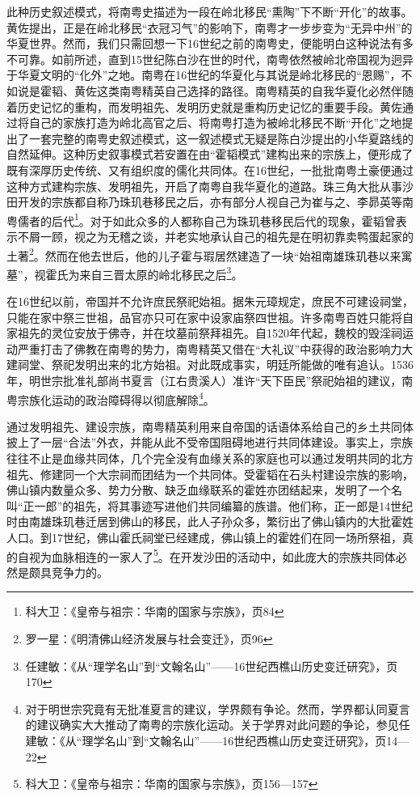 此种历史叙述模式，将南粤史描述为一段在岭北移民“熏陶”下不断“开化”的故事。黄佐提出，正是在岭北移民“衣冠习气”的影响下，南粤才一步步变为“无异中州”的华夏世界。然而，我们只需回想一下16世纪之前的南粤史，便能明白这种说法有多不可靠。如前所述，直到15世纪陈白沙在世的时代，南粤依然被岭北帝国视为迥异于华夏文明的“化外”之地。南粤在16世纪的华夏化与其说是岭北移民的“恩赐”，不如说是霍韬、黄佐这类南粤精英自己选择的路径。南粤精英的自我华夏化必然伴随着历史记忆的重构，而发明祖先、发明历史就是重构历史记忆的重要手段。黄佐通过将自己的家族打造为岭北高官之后、将南粤打造为被岭北移民不断“开化”之地提出了一套完整的南粤史叙述模式，这一叙述模式无疑是陈白沙提出的小华夏路线的自然延伸。这种历史叙事模式若安置在由“霍韬模式”建构出来的宗族上，便形成了既有深厚历史传统、又有组织度的儒化共同体。在16世纪，一批批南粤土豪便通过这种方式建构宗族、发明祖先，开启了南粤自我华夏化的道路。珠三角大批从事沙田开发的宗族都自称乃珠玑巷移民之后，亦有部分人视自己为崔与之、李昴英等南粤儒者的后代\footnote{科大卫：《皇帝与祖宗：华南的国家与宗族》，页84}。对于如此众多的人都称自己为珠玑巷移民后代的现象，霍韬曾表示不屑一顾，视之为无稽之谈，并老实地承认自己的祖先是在明初靠卖鸭蛋起家的土著\footnote{罗一星：《明清佛山经济发展与社会变迁》，页96}。然而在他去世后，他的儿子霍与瑕居然建造了一块“始祖南雄珠玑巷以来寓墓”，视霍氏为来自三晋太原的岭北移民之后\footnote{任建敏：《从“理学名山”到“文翰名山”——16世纪西樵山历史变迁研究》，页170}。

在16世纪以前，帝国并不允许庶民祭祀始祖。据朱元璋规定，庶民不可建设祠堂，只能在家中祭三世祖，品官亦只可在家中设家庙祭四世祖。许多南粤百姓只能将自家祖先的灵位安放于佛寺，并在坟墓前祭拜祖先。自1520年代起，魏校的毁淫祠运动严重打击了佛教在南粤的势力，南粤精英又借在“大礼议”中获得的政治影响力大建祠堂、祭祀发明出来的北方始祖。对此既成事实，明廷所能做的唯有追认。1536年，明世宗批准礼部尚书夏言（江右贵溪人）准许“天下臣民”祭祀始祖的建议，南粤宗族化运动的政治障碍得以彻底解除\footnote{对于明世宗究竟有无批准夏言的建议，学界颇有争论。然而，学界都认同夏言的建议确实大大推动了南粤的宗族化运动。关于学界对此问题的争论，参见任建敏：《从“理学名山”到“文翰名山”——16世纪西樵山历史变迁研究》，页14—22}。

通过发明祖先、建设宗族，南粤精英利用来自帝国的话语体系给自己的乡土共同体披上了一层“合法”外衣，并能从此不受帝国阻碍地进行共同体建设。事实上，宗族往往不止是血缘共同体，几个完全没有血缘关系的家庭也可以通过发明共同的北方祖先、修建同一个大宗祠而团结为一个共同体。受霍韬在石头村建设宗族的影响，佛山镇内数量众多、势力分散、缺乏血缘联系的霍姓亦团结起来，发明了一个名叫“正一郎”的祖先，将其事迹写进他们共同编纂的族谱。他们称，正一郎是14世纪时由南雄珠玑巷迁居到佛山的移民，此人子孙众多，繁衍出了佛山镇内的大批霍姓人口。到17世纪，佛山霍氏祠堂已经建成，佛山镇上的霍姓们在同一场所祭祖，真的自视为血脉相连的一家人了\footnote{科大卫：《皇帝与祖宗：华南的国家与宗族》，页156—157}。在开发沙田的活动中，如此庞大的宗族共同体必然是颇具竞争力的。

